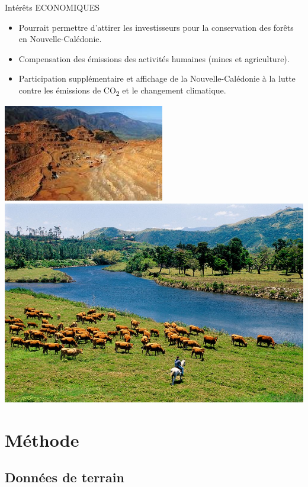 \documentclass[10pt,table,dvipsnames,compress]{beamer}
\begin{document}
\begin{frame}[label={sec:org0e1055a}]{Intérêts ECONOMIQUES}
\begin{itemize}
\item \alert{Pourrait} permettre d'attirer les investisseurs pour la conservation des forêts en Nouvelle-Calédonie.
\item Compensation des émissions des activités humaines (mines et agriculture).
\item Participation supplémentaire et affichage de la Nouvelle-Calédonie à la lutte contre les émissions de CO\textsubscript{2} et le changement climatique.
\end{itemize}

\begin{center}
\includegraphics[height=0.3\textheight]{figs/mines.jpg}
\includegraphics[height=0.3\textheight]{figs/agriculture.jpg}
\end{center}
\end{frame}


\section{Méthode}
\label{sec:org3675ebd}

\subsection{Données de terrain}
\label{sec:orgbb12497}
\end{document}
